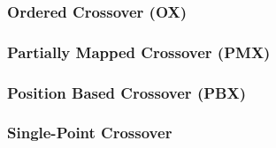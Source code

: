     \subsubsection{Ordered Crossover (OX)}
    \label{sec:keen:operators:crossover:ordered}
      \Blindtext
    \subsubsection{Partially Mapped Crossover (PMX)}
    \label{sec:keen:operators:crossover:partially_mapped}
      \Blindtext
    \subsubsection{Position Based Crossover (PBX)}
    \label{sec:keen:operators:crossover:position_based}
      \Blindtext
    \subsubsection{Single-Point Crossover}
    \label{sec:keen:operators:crossover:single_point}
      \Blindtext

